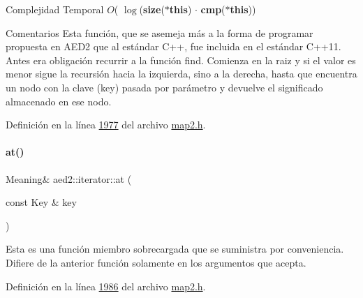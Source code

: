 \begin{DoxyDescription}
\item[Complejidad Temporal]$O$( $\log$({\bfseries size}({\bfseries $\ast$this}) $\cdot$ {\bfseries cmp}({\bfseries $\ast$this}))
\end{DoxyDescription}

\begin{DoxyRemark}{Comentarios}
Esta función, que se asemeja más a la forma de programar propuesta en A\+E\+D2 que al estándar C++, fue incluida en el estándar C++11. Antes era obligación recurrir a la función find. Comienza en la raiz y si el valor es menor sigue la recursión hacia la izquierda, sino a la derecha, hasta que encuentra un nodo con la clave (key) pasada por parámetro y devuelve el significado almacenado en ese nodo. 
\end{DoxyRemark}


Definición en la línea \hyperlink{map2_8h_source_l01977}{1977} del archivo \hyperlink{map2_8h_source}{map2.\+h}.

\mbox{\label{classaed2_1_1iterator_ac0459c685868fba041b9be2cde974119_ac0459c685868fba041b9be2cde974119}} 
\paragraph{\texorpdfstring{at()}{at()}\hspace{0.1cm}{\footnotesize\ttfamily [2/2]}}
{\footnotesize\ttfamily Meaning\& aed2\+::iterator\+::at (\begin{DoxyParamCaption}\item[{const Key \&}]{key }\end{DoxyParamCaption})\hspace{0.3cm}{\ttfamily [inline]}}

Esta es una función miembro sobrecargada que se suministra por conveniencia. Difiere de la anterior función solamente en los argumentos que acepta. 

Definición en la línea \hyperlink{map2_8h_source_l01986}{1986} del archivo \hyperlink{map2_8h_source}{map2.\+h}.

\mbox{\label{classaed2_1_1iterator_af74d214f3278d8cd6b3a5a721e173fa3_af74d214f3278d8cd6b3a5a721e173fa3}} 
